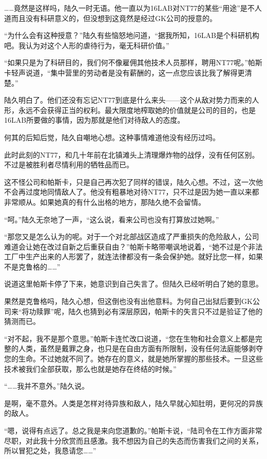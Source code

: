 ……竟然是这样吗，陆久一时无语。他一直以为16LAB对NT77的某些“用途”是不人道而且没有科研意义的，但没想到这竟然是经过GK公司的授意的。

“为什么会有这种授意？”陆久有些恼怒地问道，“据我所知，16LAB是个科研机构吧。我认为对这个人形的虐待行为，毫无科研价值。”

“如果只是为了科研目的，我们何不像雇佣其他技术人员那样，聘用NT77呢。”帕斯卡轻声说道，“集中营里的劳动者是没有薪酬的，这一点您应该比我了解得更清楚。”

陆久明白了。他们还没有忘记NT77到底是什么来头——这个从敌对势力而来的人形，永远不会获得正当的权利。最大限度地榨取她的价值就是公司的目的，也是16LAB所要做的事情，因为那就是他们对待敌人的态度。

何其的后知后觉，陆久自嘲地心想。这种事情难道他没有经历过吗。

此时此刻的NT77，和几十年前在北镇滩头上清理爆炸物的战俘，没有任何区别。不过是被胜利者尽情利用的牺牲品而已。

这不怪公司和帕斯卡，只是自己再次犯了同样的错误，陆久心想。不过，这一次他不会再过度地同情敌人了。他没有粗暴地对待NT77，只不过是因为她一直以来都非常顺从。如果她真的有什么出格的地方，那陆久绝不会留情。

“呵。”陆久无奈地了一声，“这么说，看来公司也没有打算放过她啊。”

“那您又是怎么认为的呢。对于一个对北部战区造成了严重损失的危险敌人，公司难道会让她在改过自新之后重获自由？”帕斯卡略带嘲讽地说着，“她不过是个非法工厂中生产出来的人形罢了，就连法律都没有一条会保护她。就好比您一样，如果不是克鲁格的……”

说道这里帕斯卡停了下来，她意识到自己失言了。但陆久已经听明白了她的意思。

果然是克鲁格吗，陆久心想，但这倒也没有出他意料。为何自己出狱后要到GK公司来“将功赎罪”呢，陆久也猜到必有深层原因，帕斯卡的失言只不过是验证了他的猜测而已。

“对不起，我不是那个意思。”帕斯卡连忙改口说道，“您在生物和社会意义上都是完整的人类，虽然是戴罪之身，也只是在自由方面有所限制，没有任何法庭能够剥夺您的生命。不过她就不同了。她存在的意义，就是她所掌握的那些技术。一旦这些技术被我们全部获取，那么也就是她存在终结的时候。”

“……我并不意外。”陆久说。

是啊，毫不意外。人类是怎样对待异族和敌人，陆久早就心知肚明，更何况的异族的敌人。

“嗯，说得有点远了。总之我是来向您道歉的。”帕斯卡说，“陆司令在工作方面非常尽职，对此我十分欣赏而且感激。我不想因为自己的失态而伤害我们之间的关系，所以冒犯之处，我恳请您……”

